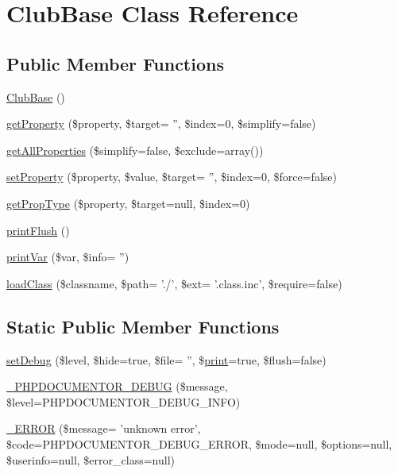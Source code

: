 \hypertarget{class_club_base}{\section{\-Club\-Base \-Class \-Reference}
\label{class_club_base}
}
\subsection*{\-Public \-Member \-Functions}
\begin{DoxyCompactItemize}
\item 
\hyperlink{class_club_base_a5f7e3fcfdf154c6ce3160dee29dc0cfc}{\-Club\-Base} ()
\item 
\hyperlink{class_club_base_ab98c8af3ebe6a93b077990142c6870b8}{get\-Property} (\$property, \$target= '', \$index=0, \$simplify=false)
\item 
\hyperlink{class_club_base_aac982cbdc597063ab18fca089529e760}{get\-All\-Properties} (\$simplify=false, \$exclude=array())
\item 
\hyperlink{class_club_base_a3bc07035afdc09ef24dd683bd04a8a70}{set\-Property} (\$property, \$value, \$target= '', \$index=0, \$force=false)
\item 
\hyperlink{class_club_base_a6d1d209ba105f7fa2c0a957765c426f1}{get\-Prop\-Type} (\$property, \$target=null, \$index=0)
\item 
\hyperlink{class_club_base_a486ff145bcdb40c2c95fa7e571094044}{print\-Flush} ()
\item 
\hyperlink{class_club_base_ae2ec414e416ccf308871485d6566a4ab}{print\-Var} (\$var, \$info= '')
\item 
\hyperlink{class_club_base_a5a13e7e61831425b5ed7569bbcbd56a5}{load\-Class} (\$classname, \$path= './', \$ext= '.class.\-inc', \$require=false)
\end{DoxyCompactItemize}
\subsection*{\-Static \-Public \-Member \-Functions}
\begin{DoxyCompactItemize}
\item 
\hyperlink{class_club_base_a8f213a64645fcfa523f0cea44602e344}{set\-Debug} (\$level, \$hide=true, \$file= '', \$\hyperlink{tokenizer__test_8php_a3ad3a4240c0f97c7e85aff5c52a454d4}{print}=true, \$flush=false)
\item 
\hyperlink{class_club_base_a6e3dfe5812adeeafd256d9001d418a00}{\-\_\-\-P\-H\-P\-D\-O\-C\-U\-M\-E\-N\-T\-O\-R\-\_\-\-D\-E\-B\-U\-G} (\$message, \$level=\-P\-H\-P\-D\-O\-C\-U\-M\-E\-N\-T\-O\-R\-\_\-\-D\-E\-B\-U\-G\-\_\-\-I\-N\-F\-O)
\item 
\hyperlink{class_club_base_a569202f016e5285687d3be68677c24fd}{\-\_\-\-E\-R\-R\-O\-R} (\$message= 'unknown error', \$code=\-P\-H\-P\-D\-O\-C\-U\-M\-E\-N\-T\-O\-R\-\_\-\-D\-E\-B\-U\-G\-\_\-\-E\-R\-R\-O\-R, \$mode=null, \$options=null, \$userinfo=null, \$error\-\_\-class=null)
\end{DoxyCompactItemize}
